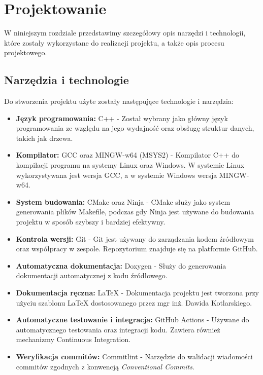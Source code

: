 \newpage
\section{Projektowanie}		%

W niniejszym rozdziale przedstawimy szczegółowy opis narzędzi i technologii, które zostały wykorzystane do realizacji projektu, a także opis procesu projektowego.

\subsection{Narzędzia i technologie}

Do stworzenia projektu użyte zostały następujące technologie i narzędzia:

\begin{itemize}
	\item \textbf{Język programowania:} C++ - Został wybrany jako główny język programowania ze względu na jego wydajność oraz obsługę struktur danych, takich jak drzewa.
	\item \textbf{Kompilator:} GCC oraz MINGW-w64 (MSYS2) - Kompilator C++ do kompilacji programu na systemy Linux oraz Windows. W systemie Linux wykorzystywana jest wersja GCC, a w systemie Windows wersja MINGW-w64.
	\item \textbf{System budowania:} CMake oraz Ninja - CMake służy jako system generowania plików Makefile, podczas gdy Ninja jest używane do budowania projektu w sposób szybszy i bardziej efektywny.
	\item \textbf{Kontrola wersji:} Git - Git jest używany do zarządzania kodem źródłowym oraz współpracy w zespole. Repozytorium znajduje się na platformie GitHub.
	\item \textbf{Automatyczna dokumentacja:} Doxygen - Służy do generowania dokumentacji automatycznej z kodu źródłowego.
	\item \textbf{Dokumentacja ręczna:} LaTeX - Dokumentacja projektu jest tworzona przy użyciu szablonu LaTeX dostosowanego przez mgr inż. Dawida Kotlarskiego.
	\item \textbf{Automatyczne testowanie i integracja:} GitHub Actions - Używane do automatycznego testowania oraz integracji kodu. Zawiera również mechanizmy Continuous Integration.
	\item \textbf{Weryfikacja commitów:} Commitlint - Narzędzie do walidacji wiadomości commitów zgodnych z konwencją \textit{Conventional Commits}.
\end{itemize}

